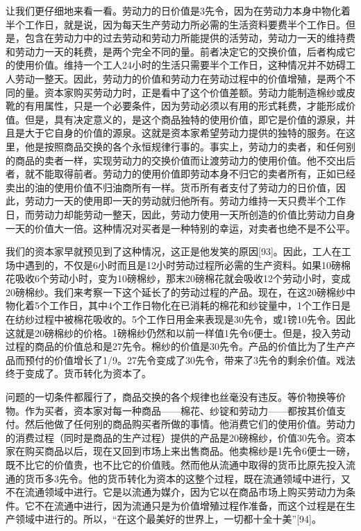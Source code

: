 \documentclass{ctexbook}
\begin{document}
    让我们更仔细地来看一看。劳动力的日价值是3先令，因为在劳动力本身中物化着半个工作日，就是说，因为每天生产劳动力所必需的生活资料要费半个工作日。但是，包含在劳动力中的过去劳动和劳动力所能提供的活劳动，劳动力一天的维持费和劳动力一天的耗费，是两个完全不同的量。前者决定它的交换价值，后者构成它的使用价值。维持一个工人24小时的生活只需要半个工作日，这种情况并不妨碍工人劳动一整天。因此，劳动力的价值和劳动力在劳动过程中的价值增殖，是两个不同的量。资本家购买劳动力时，正是看中了这个价值差额。劳动力能制造棉纱或皮靴的有用属性，只是一个必要条件，因为劳动必须以有用的形式耗费，才能形成价值。但是，具有决定意义的，是这个商品独特的使用价值，即它是价值的源泉，并且是大于它自身的价值的源泉。这就是资本家希望劳动力提供的独特的服务。在这里，他是按照商品交换的各个永恒规律行事的。事实上，劳动力的卖者，和任何别的商品的卖者一样，实现劳动力的交换价值而让渡劳动力的使用价值。他不交出后者，就不能取得前者。劳动力的使用价值即劳动本身不归它的卖者所有，正如已经卖出的油的使用价值不归油商所有一样。货币所有者支付了劳动力的日价值，因此，劳动力一天的使用即一天的劳动就归他所有。劳动力维持一天只费半个工作日，而劳动力却能劳动一整天，因此，劳动力使用一天所创造的价值比劳动力自身一天的价值大一倍。这种情况对买者是一种特别的幸运，对卖者也绝不是不公平。
    
    我们的资本家早就预见到了这种情况，这正是他发笑的原因[93]。因此，工人在工场中遇到的，不仅是6小时而且是12小时劳动过程所必需的生产资料。如果10磅棉花吸收6个劳动小时，变为10磅棉纱，那末20磅棉花就会吸收12个劳动小时，变成20磅棉纱。我们来考察一下这个延长了的劳动过程的产品。现在，在这20磅棉纱中物化着5个工作日，其中4个工作日物化在已消耗的棉花和纱锭量中，1个工作日是在纺纱过程中被棉花吸收的。5个工作日用金来表现是30先令，或1镑10先令。因此这就是20磅棉纱的价格。1磅棉纱仍然和以前一样值1先令6便士。但是，投入劳动过程的商品的价值总和是27先令。棉纱的价值是30先令。产品的价值比为了生产产品而预付的价值增长了1/9。27先令变成了30先令，带来了3先令的剩余价值。戏法终于变成了。货币转化为资本了。
    
    问题的一切条件都履行了，商品交换的各个规律也丝毫没有违反。等价物换等价物。作为买者，资本家对每一种商品——棉花、纱锭和劳动力——都按其价值支付。然后他做了任何别的商品购买者所做的事情。他消费它们的使用价值。劳动力的消费过程（同时是商品的生产过程）提供的产品是20磅棉纱，价值30先令。资本家在购买商品以后，现在又回到市场上来出售商品。他卖棉纱是1先令6便士一磅，既不比它的价值贵，也不比它的价值贱。然而他从流通中取得的货币比原先投入流通的货币多3先令。他的货币转化为资本的这整个过程，既在流通领域中进行，又不在流通领域中进行。它是以流通为媒介，因为它以在商品市场上购买劳动力为条件。它不在流通中进行，因为流通只是为价值增殖过程作准备，而这个过程是在生产领域中进行的。所以，“在这个最美好的世界上，一切都十全十美”[94]。
    
\end{document}
